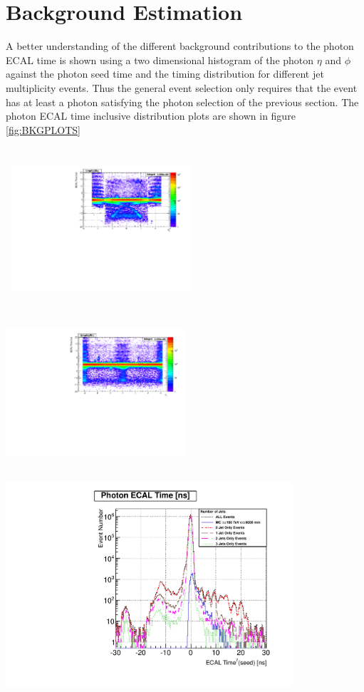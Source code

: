 \section{Background Estimation}
A better understanding of the different background contributions to the photon ECAL time is shown using a two dimensional histogram of the photon $\eta$ and $\phi$ against the photon seed time and the timing distribution for different jet multiplicity events. Thus the general event selection only requires that the event has at least a photon satisfying the photon selection of the previous section.
The photon ECAL time inclusive distribution plots are shown in figure \ref{fig:BKGPLOTS}

\begin{center}
\centering
\mbox{
\includegraphics[height=6cm, width=0.5\textwidth]{THESISPLOTS/SinglePhotonDataSet-TimeVsEta.pdf}
\includegraphics[height=6cm, width=0.5\textwidth]{THESISPLOTS/SinglePhotonDataSet-TimeVsPhi.pdf}}
\includegraphics[height=8cm, width=0.8\textwidth]{THESISPLOTS/Photon_SeedXtalTime_Distribution_VsJetMultiplicity.pdf}
\label{fig:BKGPLOTS}
\end{center}
